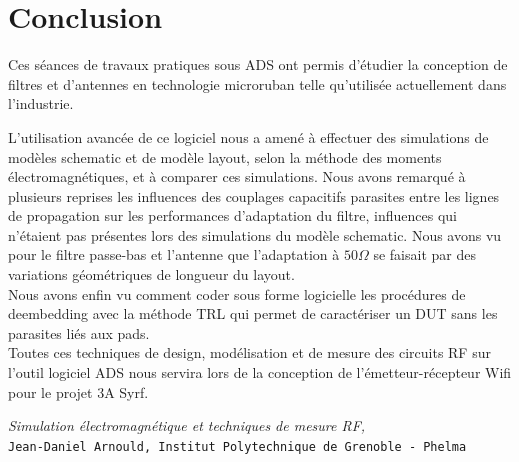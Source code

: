 \documentclass[a4paper]{article}
\begin{document}
\section{Conclusion}

Ces s\'eances de travaux pratiques sous ADS ont permis d'\'etudier la conception de filtres et
 d'antennes en technologie microruban telle qu'utilis\'ee actuellement dans l'industrie.

L'utilisation avanc\'ee de ce logiciel nous a amen\'e \`a effectuer des simulations de mod\`eles schematic et de mod\`ele layout, selon la m\'ethode des
 moments \'electromagn\'etiques, et \`a comparer ces simulations. Nous avons remarqu\'e \`a plusieurs reprises les influences des couplages capacitifs
parasites entre les lignes de propagation sur les performances d'adaptation du filtre, influences qui n'\'etaient pas pr\'esentes lors des simulations
du mod\`ele schematic.
Nous avons vu pour le filtre passe-bas et l'antenne que l'adaptation \`a $50 \Omega$ se faisait par des variations g\'eom\'etriques de longueur du layout.\\

Nous avons enfin vu comment coder sous forme logicielle les proc\'edures de deembedding avec la m\'ethode TRL qui permet de caract\'eriser un DUT sans les parasites li\'es aux pads.\\

Toutes ces techniques de design, mod\'elisation et de mesure des circuits RF sur l'outil logiciel ADS nous servira lors de la conception de
 l'\'emetteur-r\'ecepteur Wifi pour le projet 3A Syrf.


\clearpage
{}

\begin{thebibliography}{9}

\textit{Simulation \'electromagn\'etique et techniques de mesure RF,}\\
\texttt{Jean-Daniel Arnould, Institut Polytechnique de Grenoble - Phelma}

\end{thebibliography}
\end{document}
